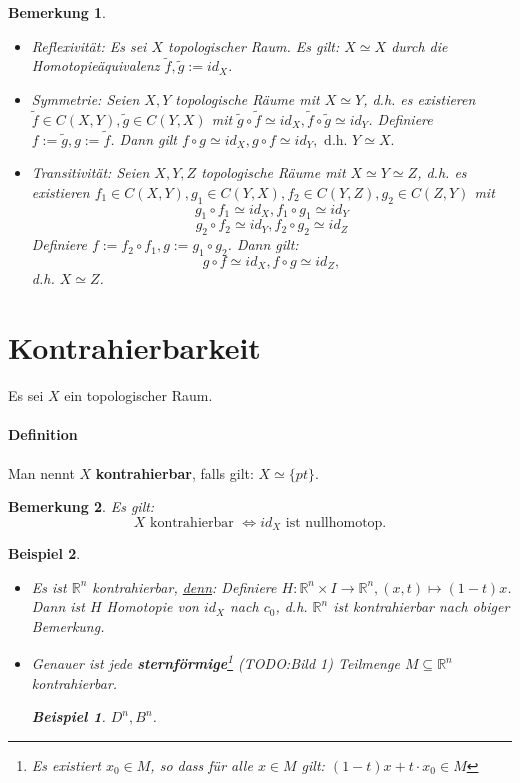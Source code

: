 \documentclass[a4paper,11pt,notitlepage]{report}
\newtheorem{remark}{Bemerkung}[chapter]
\newtheorem{example}{Beispiel}[chapter]
\newcommand{\R}{{\ensuremath{\mathbb{R}}}}
\begin{document}
\begin{remark}
	$ $
	\begin{itemize}
		\item Reflexivität: Es sei $X$ topologischer Raum.
			Es gilt: $X \simeq X$ durch die Homotopieäquivalenz $\tilde{f},\tilde{g} := id_X$.
		\item Symmetrie: Seien $X,Y$ topologische Räume mit $X \simeq Y$, d.h. es existieren $\tilde{f} \in C(X,Y), \tilde{g} \in C(Y,X)$ mit $\tilde{g} \circ \tilde{f} \simeq id_X, \tilde{f} \circ \tilde{g} \simeq id_Y$.
		Definiere $f:= \tilde{g}, g:= \tilde{f}$.
		Dann gilt $f \circ g \simeq id_X, g \circ f \simeq id_Y,\text{ d.h. }Y \simeq X.$
		
		\item Transitivität: Seien $X,Y,Z$ topologische Räume mit $X \simeq Y \simeq Z$, d.h. es existieren $f_1 \in C(X,Y), g_1 \in C(Y,X), f_2 \in C(Y,Z), g_2 \in C(Z,Y)$ mit
		$$g_1 \circ f_1 \simeq id_X, f_1 \circ g_1 \simeq id_Y$$
		$$g_2 \circ f_2 \simeq id_Y, f_2 \circ g_2 \simeq id_Z$$
		Definiere $f := f_2 \circ f_1, g:= g_1 \circ g_2$. Dann gilt:
		$$g \circ f \simeq id_X, f \circ g \simeq id_Z,$$
		d.h. $X \simeq Z$.
	\end{itemize}
\end{remark}

\section{Kontrahierbarkeit}
Es sei $X$ ein topologischer Raum.

\paragraph{Definition} Man nennt $X$ \textbf{kontrahierbar}, falls gilt: $X \simeq \{pt\}$.

\begin{remark}
	Es gilt:
	$$X \text{ kontrahierbar } \Leftrightarrow id_X \text{ ist nullhomotop.}$$
\end{remark}

\begin{example}{}
$ $
\begin{itemize}
	\item Es ist $\R^n$ kontrahierbar, \underline{denn}: \newline
	Definiere $H \colon \R^n \times I \rightarrow \R^n, (x,t) \mapsto (1-t)x$.
	Dann ist $H$ Homotopie von $id_X$ nach $c_0$, d.h. $\R^n$ ist kontrahierbar nach obiger Bemerkung.
	\item Genauer ist jede \textbf{sternförmige}\footnote{Es existiert $x_0 \in M$, so dass für alle $x \in M$ gilt: $(1-t)x + t \cdot x_0 \in M$} (TODO:Bild 1) Teilmenge $M \subseteq \R^n$ kontrahierbar.
		\begin{example}
			$D^n, B^n$.
		\end{example}
\end{itemize}
\end{example}
\end{document}
